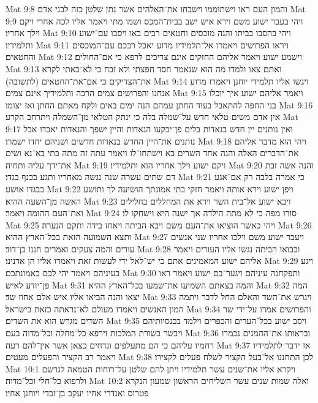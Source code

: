 Mat 9:8  והמון העם ראו וישתוממו וישבחו את־האלהים אשר נתן שלטן כזה לבני אדם׃
Mat 9:9  ויהי בעבר ישוע משם וירא איש ישב בבית־המכס ושמו מתי ויאמר אליו לכה אחרי ויקם וילך אחריו׃
Mat 9:10  ויהי בהסבו בביתו והנה מוכסים וחטאים רבים באו ויסבו עם־ישוע ותלמידיו׃
Mat 9:11  ויראו הפרושים ויאמרו אל־תלמידיו מדוע יאכל רבכם עם־המוכסים והחטאים׃
Mat 9:12  וישמע ישוע ויאמר אליהם החזקים אינם צריכים לרפא כי אם־החולים׃
Mat 9:13  ואתם צאו ולמדו מה הוא שנאמר חסד חפצתי ולא זבח כי לא־באתי לקרא את־הצדיקים כי אם־את־החטאים (לתשובה)׃
Mat 9:14  ויגשו אליו תלמידי יוחנן ויאמרו מדוע אנחנו והפרושים צמים הרבה ותלמידיך אינם צמים׃
Mat 9:15  ויאמר אליהם ישוע איך יוכלו בני החפה להתאבל בעוד החתן עמהם הנה ימים באים ולקח מאתם החתן ואז יצומו׃
Mat 9:16  אין אדם משים טלאי חדש על־שמלה בלה כי ינתק הטלאי מן־השמלה ויתרחב הקרע׃
Mat 9:17  ואין נותנים יין חדש בנאדות בלים פן־יבקעו הנאדות והיין ישפך והנאדות יאבדו אבל נותנים את־היין החדש בנאדות חדשים ושניהם יחדו ישמרו׃
Mat 9:18  ויהי הוא מדבר אליהם את־הדברים האלה והנה אחד השרים בא וישתחו־לו ויאמר עתה זה מתה בתי בא־נא ושים את־ידך עליה ותחיה׃
Mat 9:19  ויקם ישוע וילך אחריו הוא ותלמידיו׃
Mat 9:20  והנה אשה זבת דם שתים עשרה שנה נגשה מאחריו ותגע בכנף בגדו׃
Mat 9:21  כי אמרה בלבה רק אם־אגע בבגדו אושע׃
Mat 9:22  ויפן ישוע וירא אותה ויאמר חזקי בתי אמונתך הושיעה לך ותושע האשה מן־השעה ההיא׃
Mat 9:23  ויבא ישוע אל־בית השר וירא את המחללים בחלילים ואת־העם ההומה ויאמר׃
Mat 9:24  סורו מפה כי לא מתה הילדה אך ישנה היא וישחקו לו׃
Mat 9:25  ויהי כאשר הוציאו את־העם משם ויבא הביתה ויאחז בידה ותקם הנערה׃
Mat 9:26  ותצא השמועה הזאת בכל־הארץ ההיא׃
Mat 9:27  ויעבר ישוע משם וילכו אחריו שני אנשים עורים והמה צעקים ואמרים חננו בן־דוד׃
Mat 9:28  וכבואו הביתה נגשו אליו העורים ויאמר אליהם ישוע המאמינים אתם כי יש־לאל ידי לעשות זאת ויאמרו אליו הן אדנינו׃
Mat 9:29  ויגע בעיניהם ויאמר יהי לכם כאמונתכם׃
Mat 9:30  ותפקחנה עיניהם ויגער־בם ישוע ויאמר ראו פן־יודע לאיש׃
Mat 9:31  והמה בצאתם השמיעו את־שמעו בכל־הארץ ההיא׃
Mat 9:32  המה יצאו והנה הביאו אליו איש אלם אחוז שד׃
Mat 9:33  ויגרש את־השד והאלם החל לדבר ויתמה המון האנשים ויאמרו מעולם לא־נראתה כזאת בישראל׃
Mat 9:34  והפרושים אמרו על־ידי שר השדים מגרש הוא את השדים׃
Mat 9:35  ויסב ישוע בכל־הערים והכפרים וילמד בכנסיותיהם ויבשר בשורת המלכות וירפא כל־מחלה וכל־מדוה בעם׃
Mat 9:36  ובראותו את־ההמנים נכמרו רחמיו עליהם כי הם מתעלפים ונדחים כצאן אשר אין־להם רעה׃
Mat 9:37  אז ידבר לתלמידיו ויאמר רב הקציר והפעלים מעטים׃
Mat 9:38  לכן התחננו אל־בעל הקציר לשלח פעלים לקצירו׃
Mat 10:1  ויקרא אליו את־שנים עשר תלמידיו ויתן להם שלטן על־רוחות הטמאה לגרשם ולרפוא כל־חלי וכל־מדוה׃
Mat 10:2  ואלה שמות שנים עשר השליחים הראשון שמעון הנקרא פטרוס ואנדרי אחיו יעקב בן־זבדי ויוחנן אחיו׃

